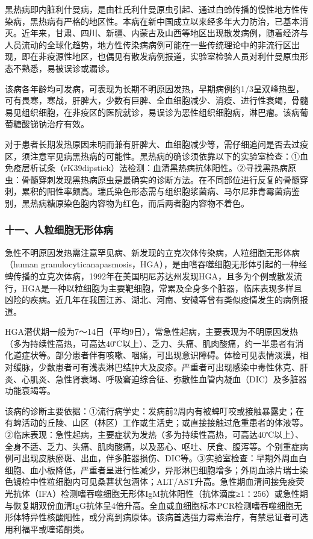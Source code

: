 黑热病即内脏利什曼病，是由杜氏利什曼原虫引起、通过白蛉传播的慢性地方性传染病，黑热病有严格的地区性。本病在新中国成立以来经多年大力防治，已基本消灭。近年来，甘肃、四川、新疆、内蒙古及山西等地区出现散发病例，随着经济与人员流动的全球化趋势，地方性传染病病例可能在一些传统理论中的非流行区出现，即在非疫源性地区，也偶见有散发病例报道，实验室检验人员对利什曼原虫形态不熟悉，易被误诊或漏诊。

该病各年龄均可发病，可表现为长期不明原因发热，早期病例约1/3呈双峰热型，可有畏寒，寒战，肝脾大，少数有巨脾、全血细胞减少、消瘦、进行性衰竭，骨髓易见组织细胞，在非疫区的医院就诊，易误诊为恶性组织细胞病，淋巴瘤。该病葡萄糖酸锑钠治疗有效。

对于患者长期发热原因未明而兼有肝脾大、血细胞减少等，需仔细追问是否去过疫区，须注意罕见病黑热病的可能性。黑热病的确诊须依靠以下的实验室检查：①血免疫层析试条（rK39dipstick）法检测：血清黑热病抗体阳性。②寻找黑热病原虫：骨髓穿刺发现黑热病原虫是最确实的诊断方法。在不同部位进行反复的骨髓穿刺，累积的阳性率颇高。瑞氏染色形态需与组织胞浆菌病、马尔尼菲青霉菌病鉴别，黑热病糖原染色胞内容物为红色，而后两者胞内容物不着色。

\subsubsection{十一、人粒细胞无形体病}

急性不明原因发热需注意罕见病、新发现的立克次体传染病，人粒细胞无形体病（human
granulocyticanapasmosis，HGA），是由嗜吞噬细胞无形体引起的一种经蜱传播的立克次体病，1992年在美国明尼苏达州发现HGA，且多为个例或散发流行，HGA是一种以粒细胞为主要靶细胞，常累及全身多个脏器，临床表现多样且凶险的疾病。近几年在我国江苏、湖北、河南、安徽等曾有类似疫情发生的病例报道。

HGA潜伏期一般为7～14日（平均9日），常急性起病，主要表现为不明原因发热（多为持续性高热，可高达40℃以上）、乏力、头痛、肌肉酸痛，约一半患者有消化道症状等。部分患者伴有咳嗽、咽痛，可出现意识障碍。体检可见表情淡漠，相对缓脉，少数患者可有浅表淋巴结肿大及皮疹。严重者可出现感染中毒性休克、肝炎、心肌炎、急性肾衰竭、呼吸窘迫综合征、弥散性血管内凝血（DIC）及多脏器功能衰竭等。

该病的诊断主要依据：①流行病学史：发病前2周内有被蜱叮咬或接触暴露史；在有蜱活动的丘陵、山区（林区）工作或生活史；或直接接触过危重患者的体液等。②临床表现：急性起病，主要症状为发热（多为持续性高热，可高达40℃以上）、全身不适、乏力、头痛、肌肉酸痛，以及恶心、呕吐、厌食、腹泻等。个别重症病例可出现皮肤瘀斑、出血，伴多脏器损伤、DIC等。③实验室检查：早期外周血白细胞、血小板降低，严重者呈进行性减少，异形淋巴细胞增多；外周血涂片瑞士染色镜检中性粒细胞内可见桑葚状包涵体；ALT/AST升高。急性期血清间接免疫荧光抗体（IFA）检测嗜吞噬细胞无形体IgM抗体阳性（抗体滴度≥1∶256）或急性期与恢复期双份血清IgG抗体呈4倍升高。全血或血细胞标本PCR检测嗜吞噬细胞无形体特异性核酸阳性，或分离到病原体。该病首选强力霉素治疗，有禁忌证者可选用利福平或喹诺酮类。

